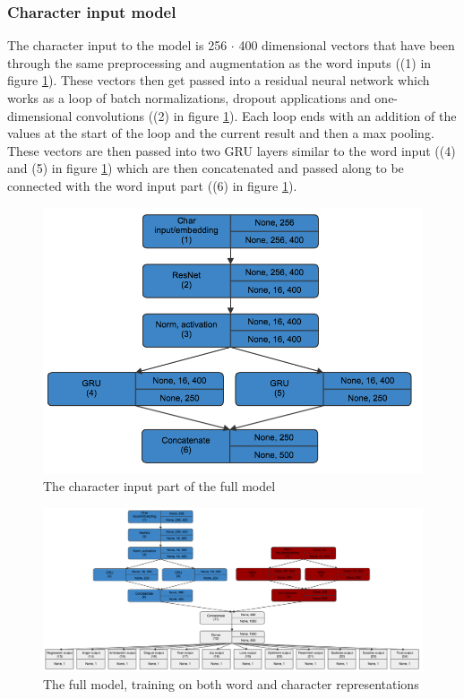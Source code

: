 \subsubsection{Character input model}
The character input to the model is 256 $\cdot$ 400 dimensional vectors that have been through the same preprocessing and augmentation as the word inputs ((1) in figure \ref{fig:charmodel}). These vectors then get passed into a residual neural network which works as a loop of batch normalizations, dropout applications and one-dimensional convolutions ((2) in figure \ref{fig:charmodel}). Each loop ends with an addition of the values at the start of the loop and the current result and then a max pooling. These vectors are then passed into two GRU layers similar to the word input ((4) and (5) in figure \ref{fig:charmodel}) which are then concatenated and passed along to be connected with the word input part ((6) in figure \ref{fig:charmodel}).
\begin{figure}[H]
	\centering
		\includegraphics[scale=0.35]{pictures/char_model.png}
		\caption{The character input part of the full model}
		\label{fig:charmodel}
\end{figure}
\begin{figure}[H]
    \centering
        \includegraphics[width=\textwidth]{pictures/model.png}
        \caption{The full model, training on both word and character representations}
        \label{fig:fullmodel}
\end{figure}

